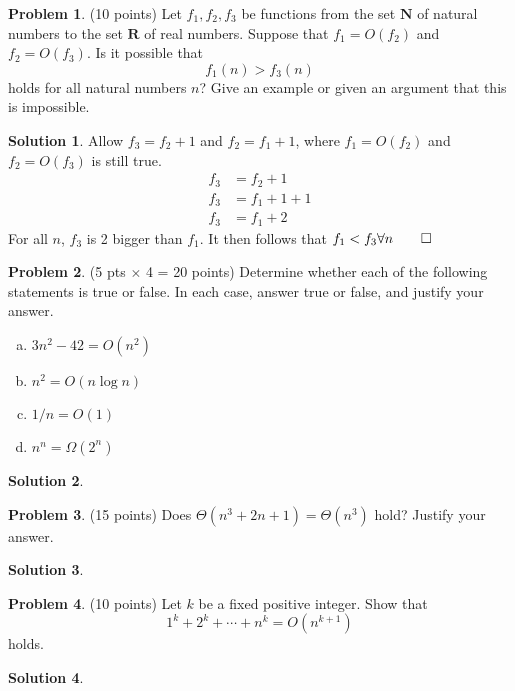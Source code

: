 \documentclass{article}
\theoremstyle{definition}
\newtheorem{problem}{Problem}
\newtheorem*{solution}{Solution}
\newcommand{\N}{\mathbf{N}}
\newcommand{\R}{\mathbf{R}}
\begin{document}
\begin{problem} (10 points) 
Let $f_1, f_2, f_3$ be functions from the set $\N$ of natural numbers
to the set $\R$ of real numbers. Suppose that $f_1= O(f_2)$ and
$f_2=O(f_3)$. Is it possible that 
$$ f_1(n) > f_3(n)$$ 
holds for all natural numbers $n$? Give an example or given an argument that this
is impossible. 
\end{problem}
\begin{solution}
Allow $f_3 = f_2 +1$ and $f_2 = f_1 +1$, where $f_1 = O(f_2)$ and $f_2 = O(f_3)$ is still true.
\begin{align*}
  f_3 &= f_2 +1 \\
  f_3 &= f_1 + 1 + 1 \\
  f_3 &= f_1 +2
\end{align*}
For all $n$, $f_3$ is 2 bigger than $f_1$. It then follows that $f_1 < f_3 \forall n \qed$
\end{solution}

\begin{problem} (5 pts $\times$ 4 = 20 points) 
Determine whether each of the following statements is true or false.
In each case, answer true or false, and justify your answer.
\begin{enumerate}[a)]
\item $3n^2-42 = O(n^2)$
\item $n^2 = O(n\log n)$
\item $1/n = O(1)$
\item $n^n = \Omega(2^n)$
\end{enumerate}
\end{problem}
\begin{solution}
\end{solution}

\begin{problem} (15 points) 
Does $\Theta(n^3+2n+1) = \Theta(n^3)$ hold?  Justify your answer.
\end{problem}
\begin{solution}
\end{solution}

\begin{problem} (10 points)
Let $k$ be a fixed positive integer. Show that 
$$ 1^k+2^k+\cdots + n^k  = O(n^{k+1}) $$ holds.
\end{problem}
\begin{solution}
\end{solution}
\end{document}
